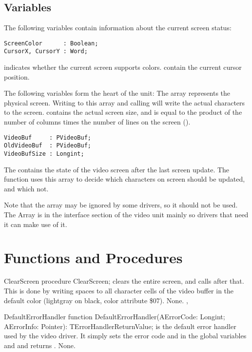 \subsection{Variables}
The following variables contain information about the current screen
status:
\begin{verbatim}
ScreenColor      : Boolean;
CursorX, CursorY : Word;
\end{verbatim}
 indicates whether the current screen supports colors.
 contain the current cursor position.

The following variables form the heart of the  unit: The
 array represents the physical screen. Writing to this
array and calling  will write the actual characters
to the screen.  contains the actual screen size, and is
equal to the product of the number of columns times the number of lines 
on the screen ().
\begin{verbatim}
VideoBuf     : PVideoBuf;
OldVideoBuf  : PVideoBuf;
VideoBufSize : Longint;
\end{verbatim}
The  contains the state of the video screen after the last
screen update. The  function uses this array to decide
which characters on screen should be updated, and which not. 

Note that the  array may be ignored by some drivers, so
it should not be used. The Array is in the interface section of the video
unit mainly so drivers that need it can make use of it. 

\section{Functions and Procedures}

\begin{procedure}{ClearScreen}
\Declaration
procedure ClearScreen; 
\Description
{} clears the entire screen, and calls 
after that. This is done by writing spaces to all character cells of the
video buffer in the default color (lightgray on black, color attribute \$07).
\Errors
None.
\SeeAlso
{}, 
\end{procedure}


\begin{procedure}{DefaultErrorHandler}
\Declaration
function  DefaultErrorHandler(AErrorCode: Longint; AErrorInfo: Pointer): TErrorHandlerReturnValue; 
\Description
{} is the default error handler used by the video
driver. It simply sets the error code  and  
in the global variables  and  and returns 
.
\Errors
None.
\SeeAlso
\end{procedure}

